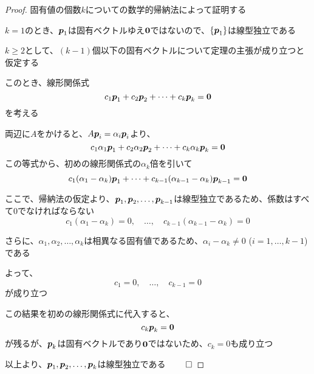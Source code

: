 \documentclass[../../../topic_linear-algebra]{subfiles}
\begin{document}
\begin{proof}
  固有値の個数$k$についての数学的帰納法によって証明する

  \br

  $k=1$のとき、$\vb*{p}_1$は固有ベクトルゆえ$\vb*{0}$ではないので、$\{\vb*{p}_1\}$は線型独立である

  \br

  $k \geq 2$として、$(k-1)$個以下の固有ベクトルについて定理の主張が成り立つと仮定する

  このとき、線形関係式
  \begin{equation*}
    c_1 \vb*{p}_1 + c_2 \vb*{p}_2 + \cdots + c_k \vb*{p}_k = \vb*{0}
  \end{equation*}
  を考える

  両辺に$A$をかけると、$A\vb*{p}_i = \alpha_i \vb*{p}_i$より、
  \begin{equation*}
    c_1 \alpha_1 \vb*{p}_1 + c_2 \alpha_2 \vb*{p}_2 + \cdots + c_k \alpha_k \vb*{p}_k = \vb*{0}
  \end{equation*}
  この等式から、初めの線形関係式の$\alpha_k$倍を引いて
  \begin{equation*}
    c_1 (\alpha_1 - \alpha_k) \vb*{p}_1 + \cdots + c_{k-1} (\alpha_{k-1} - \alpha_k) \vb*{p}_{k-1} = \vb*{0}
  \end{equation*}

  ここで、帰納法の仮定より、$\vb*{p}_1, \vb*{p}_2, \ldots, \vb*{p}_{k-1}$は線型独立であるため、係数はすべて0でなければならない
  \begin{equation*}
    c_1 (\alpha_1 - \alpha_k) = 0, \quad \ldots, \quad c_{k-1} (\alpha_{k-1} - \alpha_k) = 0
  \end{equation*}

  さらに、$\alpha_1, \alpha_2, \ldots, \alpha_k$は相異なる固有値であるため、$\alpha_i - \alpha_k \neq 0$ ($i = 1, \ldots, k-1$)である

  よって、
  \begin{equation*}
    c_1 = 0, \quad \ldots, \quad c_{k-1} = 0
  \end{equation*}
  が成り立つ

  この結果を初めの線形関係式に代入すると、
  \begin{equation*}
    c_k \vb*{p}_k = \vb*{0}
  \end{equation*}
  が残るが、$\vb*{p}_k$は固有ベクトルであり$\vb*{0}$ではないため、$c_k = 0$も成り立つ

  以上より、$\vb*{p}_1, \vb*{p}_2, \ldots, \vb*{p}_k$は線型独立である $\qed$
\end{proof}
\end{document}
